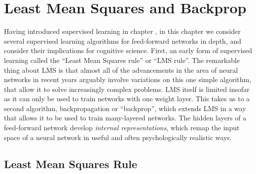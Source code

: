 \chapter{Least Mean Squares and Backprop}\label{ch_lms_backprop}


Having introduced supervised learning in chapter , in this chapter we consider several supervised learning algorithms for feed-forward networks in depth, and consider their implications for cognitive science. First, an early form of supervised learning called the ``Least Mean Squares rule'' or ``LMS rule''. The remarkable thing about LMS is that almost all of the advancements in the area of neural networks in recent years arguably involve variations on this one simple algorithm, that allow it to solve increasingly complex problems. LMS itself is limited insofar as it can only be used to train networks with one weight layer. This takes us to a second algorithm, backpropagation or ``backprop'', which extends LMS in a way that allows it to be used to train many-layered networks.  The hidden layers of a feed-forward network develop \emph{internal representations}, which remap the input space of a neural network in useful and often psychologically realistic ways.

\section{Least Mean Squares Rule}\label{lms_rule}

